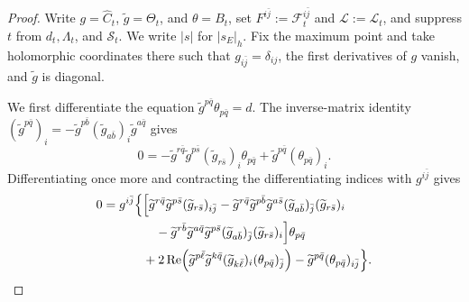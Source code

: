 \documentclass[reqno]{amsart}
\theoremstyle{plain}
\theoremstyle{remark}
\begin{document}
\begin{proof}
Write $g=\widehat C_t$, $\widetilde g=\Theta_t$, and
$\theta=B_t$, set $F^{i\bar j}:=\mathcal F_t^{i\bar j}$ and
$\mathcal L:=\mathcal L_t$, and
suppress $t$ from $d_t,\Lambda_t$, and $\mathcal S_t$. We write $|s|$ for
$|s_E|_{h}$.  Fix the maximum point and take
holomorphic coordinates there such that $g_{i\bar j}=\delta_{ij}$,
the first derivatives of $g$ vanish, and $\widetilde g$ is
diagonal.

We first differentiate the equation
$\widetilde g^{p\bar q}\theta_{p\bar q}=d$.  The inverse-matrix
identity $
 (\widetilde g^{p\bar q})_i
 =-\widetilde g^{p\bar b}(\widetilde g_{a\bar b})_i
   \widetilde g^{a\bar q}$
gives
\begin{equation}\label{eq:first-differentiated-J}
 0=-\widetilde g^{r\bar q}\widetilde g^{p\bar s}
 (\widetilde g_{r\bar s})_i\theta_{p\bar q}
 +\widetilde g^{p\bar q}(\theta_{p\bar q})_i.
\end{equation}
Differentiating once more and contracting the differentiating indices
with $g^{i\bar j}$ gives
\begin{align}
0=g^{i\bar j}\Bigl\{&
 \Bigl[\widetilde g^{r\bar q}\widetilde g^{p\bar s}
       (\widetilde g_{r\bar s})_{i\bar j}
 -\widetilde g^{r\bar q}\widetilde g^{p\bar b}
       \widetilde g^{a\bar s}
       (\widetilde g_{a\bar b})_{\bar j}
       (\widetilde g_{r\bar s})_i \notag\\
&\quad
 -\widetilde g^{r\bar b}\widetilde g^{a\bar q}
       \widetilde g^{p\bar s}
       (\widetilde g_{a\bar b})_{\bar j}
       (\widetilde g_{r\bar s})_i\Bigr]\theta_{p\bar q}
 \notag\\
&+2\operatorname{Re}\!\left(
 \widetilde g^{p\bar\ell}\widetilde g^{k\bar q}
 (\widetilde g_{k\bar\ell})_i
 (\theta_{p\bar q})_{\bar j}\right)
 -\widetilde g^{p\bar q}(\theta_{p\bar q})_{i\bar j}
 \Bigr\}.\label{eq:second-differentiated-J}
\end{align}



\end{proof}
\end{document}
